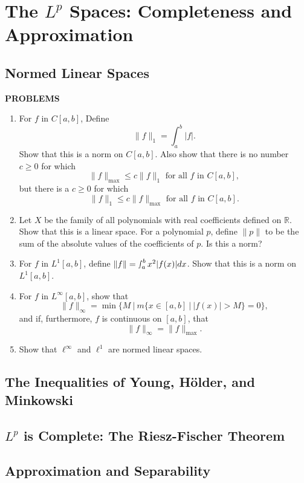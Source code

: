 \chapter{The $L^p$ Spaces: Completeness and Approximation}

\section{Normed Linear Spaces}
\begin{center}
	\textbf{PROBLEMS}
\end{center}
\begin{enumerate}
	\setcounter{enumi}{0}
	\item For $f$ in $C[a,b]$, Define
	\[
	\| f \|_1 = \int_a^b |f|.	
	\]
	Show that this is a norm on $C[a,b]$.
	Also show that there is no number $c \ge 0$ for which
	\[
	\| f \|_{\max}	\le c \| f \|_1 \text{ for all $f$ in $C[a,b]$},
	\]
	but there is a $c \ge 0$ for which 
	\[
	\| f \|_1	\le c \| f \|_{\max} \text{ for all $f$ in $C[a,b]$}.
	\]
	\item Let $X$ be the family of all polynomials with real coefficients defined on $\mathbb{R}$.
	Show that this is a linear space. For a polynomial $p$, define $\| p\|$ to be the sum of the absolute values of the coefficients of $p$.
	Is this a norm?
	\item For $f$ in $L^1[a,b]$, define $\|f\| = \smallint_a^b x^2 |f(x)|dx$.
	Show that this is a norm on $L^1[a,b]$.
	\item For $f$ in $L^\infty[a,b]$, show that 
	\[
	\| f\|_\infty = \min \biggl \{ M \ \biggl |\ m \{x \in [a,b]\ |\ |f(x)| > M \} =0 \biggr \},
	\] 
	and if, furthermore, $f$ is continuous on $[a,b]$, that
	\[
	\| f \|_{\infty} = \| f \|_{\max}.	
	\]
	\item Show that $\ell^\infty$ and $\ell^1$ are normed linear spaces.
\end{enumerate}

\section{The Inequalities of Young, H\"older, and Minkowski}
\section{$L^p$ is Complete: The Riesz-Fischer Theorem}
\section{Approximation and Separability}
